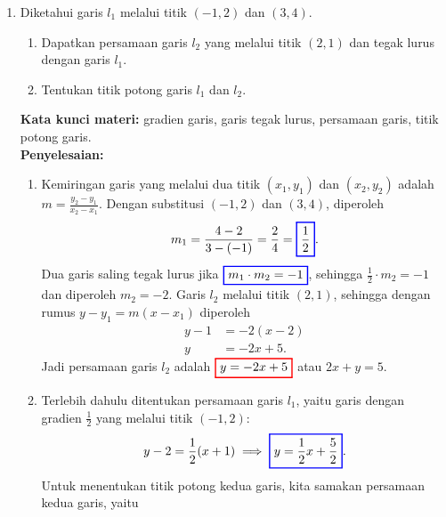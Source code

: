 \documentclass[10pt,openany,a4paper]{article}
\theoremstyle{definition}
\theoremstyle{definition}
\theoremstyle{plain}
\newenvironment{jawab}[2][tes]{%
\par\noindent\textbf{Kata kunci materi:} #1.\\
\textbf{Penyelesaian:} #2%
}{}
\begin{document}
\begin{enumerate}
    \item Diketahui garis $l_1$ melalui titik $(-1,2)$ dan $(3,4)$.
    \begin{enumerate}
        \item Dapatkan persamaan garis $l_2$ yang melalui titik $(2,1)$ dan tegak lurus dengan garis $l_1$.
        \item Tentukan titik potong garis $l_1$ dan $l_2$.
    \end{enumerate}
    \begin{jawab}[gradien garis, garis tegak lurus, persamaan garis, titik potong garis]{
        \begin{enumerate}
            \item Kemiringan garis yang melalui dua titik $(x_1,y_1)$ dan $(x_2,y_2)$ adalah $m = \frac{y_2 - y_1}{x_2 - x_1}$. Dengan substitusi $(-1,2)$ dan $(3,4)$, diperoleh
            \begin{align*}
                m_1 = \frac{4-2}{3-(-1)} = \frac{2}{4} = \colorlet{oldcolor}{.}
        \color{blue}
        \setlength{\fboxrule}{1pt} \boxed{\color{oldcolor}\frac{1}{2}}\color{oldcolor}.
            \end{align*}
            Dua garis saling tegak lurus jika $\colorlet{oldcolor}{.}
        \color{blue}
        \setlength{\fboxrule}{1pt} \boxed{\color{oldcolor}m_1\cdot m_2=-1}\color{oldcolor}$, sehingga $\frac{1}{2}\cdot m_2=-1$ dan diperoleh $m_2=-2$. Garis $l_2$ melalui titik $(2,1)$, sehingga dengan rumus $y - y_1 = m(x - x_1)$ diperoleh
            \begin{align*}
                y - 1 &= -2(x - 2)\\
                y &= -2x + 5.
            \end{align*}
            Jadi persamaan garis $l_2$ adalah $\colorlet{oldcolor}{.}
        \color{red}
        \setlength{\fboxrule}{1pt} \boxed{\color{oldcolor}y = -2x + 5}\color{oldcolor}$ atau $2x+y=5$.
            \item Terlebih dahulu ditentukan persamaan garis $l_1$, yaitu garis dengan gradien $\frac{1}{2}$ yang melalui titik $(-1,2)$:
            \begin{align*}
                y - 2 = \frac{1}{2}(x + 1) \implies \colorlet{oldcolor}{.}
        \color{blue}
        \setlength{\fboxrule}{1pt} \boxed{\color{oldcolor}y = \frac{1}{2}x + \frac{5}{2}}\color{oldcolor}.
            \end{align*}
            Untuk menentukan titik potong kedua garis, kita samakan persamaan kedua garis, yaitu
            \begin{align*}

\end{align*}
\end{enumerate}}
\end{jawab}
\end{enumerate}
\end{document}
